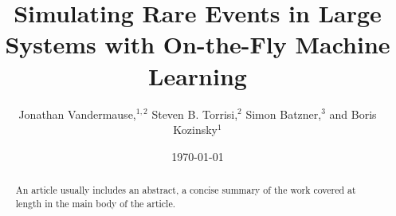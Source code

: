 \documentclass[%
    reprint,
    amsmath,amssymb,
    aps,
   ]{revtex4-1}
\begin{document}
   
   
   \title{Simulating Rare Events in Large Systems with On-the-Fly
   Machine Learning}%
   
   \author{Jonathan Vandermause,$^{1,2}$ Steven B. Torrisi,$^{2}$
           Simon Batzner,$^{3}$ and Boris Kozinsky$^{1}$}

   
   
   
   
   \date{\today}%
   
   \begin{abstract}
   An article usually includes an abstract, a concise summary of the work
   covered at length in the main body of the article. 
   \end{abstract}
   
\end{document}
